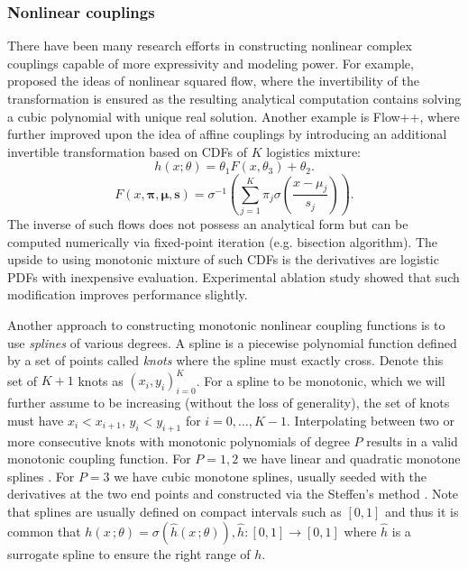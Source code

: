 \subsubsection{Nonlinear couplings} There have been many research efforts in
constructing nonlinear complex couplings capable of more expressivity and
modeling power. For example, \citep{zieglerLatentNormalizingFlows2019} proposed
the ideas of nonlinear squared flow, where the invertibility of the
transformation is ensured as the resulting analytical computation contains
solving a cubic polynomial with unique real solution. Another example is Flow++,
where \citep{hoFlowImprovingFlowBased2019} further improved upon the idea of
affine couplings by introducing an additional invertible transformation based on
CDFs of $K$ logistics mixture: $$ h(x;\theta) = \theta_1 F(x, \theta_3) +
\theta_2 .$$ $$ F(x,\bm{\pi}, \bm{\mu}, \mathbf{s}) =
\sigma^{-1}\left(\sum_{j=1}^{K}\pi_j\sigma
\left(\frac{x-\mu_j}{s_j}\right)\right) .$$ The inverse of such flows does not
possess an analytical form but can be computed numerically via fixed-point
iteration (e.g. bisection algorithm). The upside to using monotonic mixture of
such CDFs is the derivatives are logistic PDFs with inexpensive evaluation.
Experimental ablation study showed that such modification improves performance
slightly.

Another approach to constructing monotonic nonlinear coupling functions is to
use \textit{splines} of various degrees. A spline is a piecewise polynomial
function defined by a set of points called \textit{knots} where the spline must
exactly cross. Denote this set of $K+1$ knots as $(x_i, y_i)_{i=0}^K$. For a
spline to be monotonic, which we will further assume to be increasing (without
the loss of generality), the set of knots must have $x_i < x_{i+1}$, $y_i <
y_{i+1}$ for $i=0,\ldots,K-1$. Interpolating between two or more consecutive
knots with monotonic polynomials of degree $P$ results in a valid monotonic
coupling function. For $P=1,2$ we have linear and quadratic monotone splines
\citep{mullerNeuralImportanceSampling2019}. For $P=3$ we have cubic monotone
splines, usually seeded with the derivatives at the two end points and
constructed via the Steffen's method \citep{durkanCubicSplineFlows2019}. Note
that splines are usually defined on compact intervals such as $[0,1]$ and thus
it is common that $h(x\,;\theta) = \sigma(\hat{h}(x\,;\theta)), \hat{h}: [0,1]
\to [0,1]$ where $\hat{h}$ is a surrogate spline to ensure the right range of
$h$.


